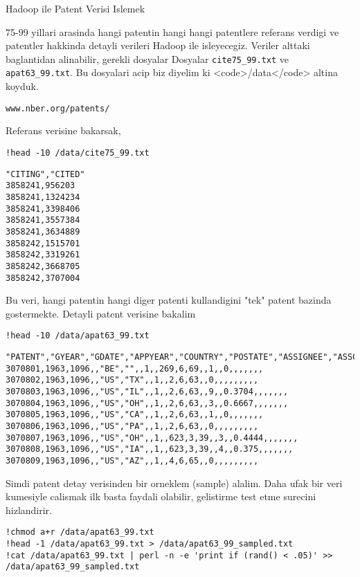 \documentclass[12pt,fleqn]{article}\usepackage{../common}
\begin{document}
Hadoop ile Patent Verisi Islemek

75-99 yillari arasinda hangi patentin hangi hangi patentlere referans
verdigi ve patentler hakkinda detayli verileri Hadoop ile
isleyecegiz. Veriler alttaki baglantidan alinabilir, gerekli dosyalar
Dosyalar \verb!cite75_99.txt! ve \verb!apat63_99.txt!. Bu dosyalari
acip biz diyelim ki <code>/data</code> altina koyduk. 

\verb!www.nber.org/patents/!

Referans verisine bakarsak,

\begin{verbatim}
!head -10 /data/cite75_99.txt
\end{verbatim}

\begin{verbatim}
"CITING","CITED"
3858241,956203
3858241,1324234
3858241,3398406
3858241,3557384
3858241,3634889
3858242,1515701
3858242,3319261
3858242,3668705
3858242,3707004
\end{verbatim}

Bu veri, hangi patentin hangi diger patenti kullandigini "tek" patent
bazinda gostermekte. Detayli patent verisine bakalim

\begin{verbatim}
!head -10 /data/apat63_99.txt
\end{verbatim}

\begin{verbatim}
"PATENT","GYEAR","GDATE","APPYEAR","COUNTRY","POSTATE","ASSIGNEE","ASSCODE","CLAIMS","NCLASS","CAT","SUBCAT","CMADE","CRECEIVE","RATIOCIT","GENERAL","ORIGINAL","FWDAPLAG","BCKGTLAG","SELFCTUB","SELFCTLB","SECDUPBD","SECDLWBD"
3070801,1963,1096,,"BE","",,1,,269,6,69,,1,,0,,,,,,,
3070802,1963,1096,,"US","TX",,1,,2,6,63,,0,,,,,,,,,
3070803,1963,1096,,"US","IL",,1,,2,6,63,,9,,0.3704,,,,,,,
3070804,1963,1096,,"US","OH",,1,,2,6,63,,3,,0.6667,,,,,,,
3070805,1963,1096,,"US","CA",,1,,2,6,63,,1,,0,,,,,,,
3070806,1963,1096,,"US","PA",,1,,2,6,63,,0,,,,,,,,,
3070807,1963,1096,,"US","OH",,1,,623,3,39,,3,,0.4444,,,,,,,
3070808,1963,1096,,"US","IA",,1,,623,3,39,,4,,0.375,,,,,,,
3070809,1963,1096,,"US","AZ",,1,,4,6,65,,0,,,,,,,,,
\end{verbatim}

Simdi patent detay verisinden bir orneklem (sample) alalim. Daha ufak bir
veri kumesiyle calismak ilk basta faydali olabilir, gelistirme test etme
surecini hizlandirir.

\begin{verbatim}
!chmod a+r /data/apat63_99.txt
!head -1 /data/apat63_99.txt > /data/apat63_99_sampled.txt
!cat /data/apat63_99.txt | perl -n -e 'print if (rand() < .05)' >> /data/apat63_99_sampled.txt
\end{verbatim}
\end{document}
